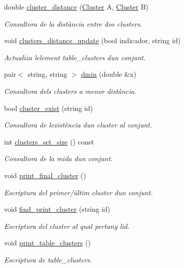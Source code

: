\begin{DoxyCompactItemize}
double \hyperlink{class_cjt___clusters_acd0e381a6b4c43933b3c6761febf9b3e}{cluster\+\_\+distance} (\hyperlink{class_cluster}{Cluster} A, \hyperlink{class_cluster}{Cluster} B)
\begin{DoxyCompactList}\small\item\em Consultora de la distància entre dos clusters. \end{DoxyCompactList}\item 
void \hyperlink{class_cjt___clusters_ad794d3d1b0df7adb7fbb35d21634f5a0}{clusters\+\_\+distance\+\_\+update} (bool indicador, string id)
\begin{DoxyCompactList}\small\item\em Actualiza l\textquotesingle{}element table\+\_\+clusters d\textquotesingle{}un conjunt. \end{DoxyCompactList}\item 
pair$<$ string, string $>$ \hyperlink{class_cjt___clusters_a3db57ec9903b4f5439679ac9ba41fab1}{dmin} (double \&x)
\begin{DoxyCompactList}\small\item\em Consultora dels clusters a menor distància. \end{DoxyCompactList}\item 
bool \hyperlink{class_cjt___clusters_aaa57cbd8d86567b4403ac9adb34a87f5}{cluster\+\_\+exist} (string id)
\begin{DoxyCompactList}\small\item\em Consultora de l\textquotesingle{}existència d\textquotesingle{}un cluster al conjunt. \end{DoxyCompactList}\item 
int \hyperlink{class_cjt___clusters_a1ecfc9a82c3a0dff467769880c355efd}{clusters\+\_\+set\+\_\+size} () const
\begin{DoxyCompactList}\small\item\em Consultora de la mida d\textquotesingle{}un conjunt. \end{DoxyCompactList}\item 
void \hyperlink{class_cjt___clusters_af0dffae314624bb0ab6f6c7f8e28a770}{print\+\_\+final\+\_\+cluster} ()
\begin{DoxyCompactList}\small\item\em Escriptura del primer/últim cluster d\textquotesingle{}un conjunt. \end{DoxyCompactList}\item 
void \hyperlink{class_cjt___clusters_a0072a1e21a58e0ab64ac96ccff068229}{find\+\_\+print\+\_\+cluster} (string id)
\begin{DoxyCompactList}\small\item\em Escriptura del cluster al qual pertany l\textquotesingle{}id. \end{DoxyCompactList}\item 
void \hyperlink{class_cjt___clusters_acc4dd33e82c36c394acd44e60f77da22}{print\+\_\+table\+\_\+clusters} ()
\begin{DoxyCompactList}\small\item\em Escriptura de table\+\_\+clusters. \end{DoxyCompactList}\end{DoxyCompactItemize}
